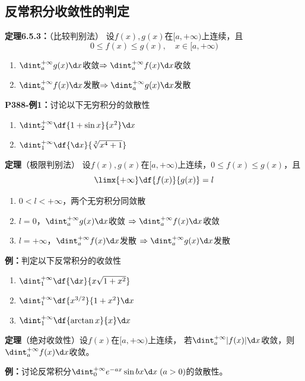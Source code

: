 \subsection{反常积分收敛性的判定}

{\bf 定理6.5.3：}（比较判别法）
设$f(x),g(x)$在$[a,+\infty)$上连续，且
$$0\leq f(x)\leq g(x),\quad x\in[a,+\infty)$$ 
\begin{enumerate}[(1)]
  \setlength{\itemindent}{1cm}
  \item
  $\dint_a^{+\infty}g(x)\d x$收敛$\Rightarrow\dint_a^{+\infty}f(x)\d x$收敛 
  \item $\dint_a^{+\infty}f(x)\d x$发散$\Rightarrow\dint_a^{+\infty}g(x)\d x$发散
\end{enumerate}

{\bf P388-例1：}讨论以下无穷积分的敛散性
\begin{enumerate}[(1)]
  \setlength{\itemindent}{1cm}
  \item $\dint_2^{+\infty}\df{1+\sin x}{x^2}\d x$ 
  \item $\dint_1^{+\infty}\df{\d x}{\sqrt[3]{x^4+1}}$
\end{enumerate}

{\bf 定理}（极限判别法）
设$f(x),g(x)$在$[a,+\infty)$上连续，$0\leq f(x)\leq g(x)$，且
$$\limx{+\infty}\df{f(x)}{g(x)}=l$$ 
\begin{enumerate}[(1)]
  \setlength{\itemindent}{1cm}
  \item $0<l<+\infty$，两个无穷积分同敛散 
  \item
  $l=0$，$\dint_a^{+\infty}g(x)\d x$收敛
  $\Rightarrow\dint_a^{+\infty}f(x)\d x$收敛 
  \item
  $l=+\infty$，$\dint_a^{+\infty}f(x)\d x$发散
  $\Rightarrow\dint_a^{+\infty}g(x)\d x$发散
\end{enumerate}

{\bf 例：}判定以下反常积分的收敛性
\begin{enumerate}[(1)]
  \setlength{\itemindent}{1cm}
  \item $\dint_1^{+\infty}\df{\d x}{x\sqrt{1+x^2}}$ 
  \item $\dint_1^{+\infty}\df{x^{3/2}}{1+x^2}\d x$ 
  \item $\dint_1^{+\infty}\df{\arctan x}{x}\d x$
\end{enumerate}

{\bf 定理}（绝对收敛性）设$f(x)$在$[a,+\infty)$上连续，
若$\dint_a^{+\infty}|f(x)|\d x$收敛，则
$\dint_a^{+\infty}f(x)\d x$收敛。

{\bf 例：}讨论反常积分$\dint_0^{+\infty}e^{-ax}\sin bx\d x\;(a>0)$的敛散性。

